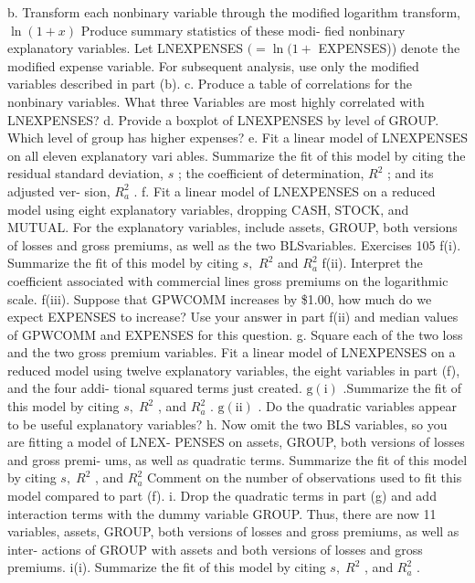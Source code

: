 \documentclass[11pt]{article}
\begin{document}
b. Transform each nonbinary variable through the modified logarithm
transform, \(\operatorname{l n} ( 1+x )\) Produce summary statistics of these modi-
fied nonbinary explanatory variables. Let LNEXPENSES \((=\operatorname{l n} ( 1+\)
EXPENSES)) denote the modified expense variable.
For subsequent analysis, use only the modified variables described
in part (b).
c. Produce a table of correlations for the nonbinary variables. What three
Variables are most highly correlated with LNEXPENSES?
d. Provide a boxplot of LNEXPENSES by level of GROUP. Which level
of group has higher expenses?
e. Fit a linear model of LNEXPENSES on all eleven explanatory vari
 ables. Summarize the fit of this model by citing the residual standard
 deviation, \(s\) ; the coefficient of determination, \(R^{2}\) ; and its adjusted ver-
 sion, \(R_{a}^{2}\) .
f. Fit a linear model of LNEXPENSES on a reduced model using eight
explanatory variables, dropping CASH, STOCK, and MUTUAL. For
the explanatory variables, include assets, GROUP, both versions of
losses and gross premiums, as well as the two BLSvariables.
 Exercises 105
f(i). Summarize the fit of this model by citing \(s , \, \, R^{2}\) and \(R_{a}^{2}\)
f(ii). Interpret the coefficient associated with commercial lines gross
 premiums on the logarithmic scale.
f(iii). Suppose that GPWCOMM increases by \$1.00, how much do we
expect EXPENSES to increase? Use your answer in part f(ii)
and median values of GPWCOMM and EXPENSES for this
question.
g. Square each of the two loss and the two gross premium variables. Fit
 a linear model of LNEXPENSES on a reduced model using twelve
explanatory variables, the eight variables in part (f), and the four addi-
 tional squared terms just created.
\(\mathrm{g ( i )}\) .Summarize the fit of this model by citing \(s , \; R^{2}\) , and \(R_{a}^{2}\) .
\(\mathrm{g ( i i )}\) . Do the quadratic variables appear to be useful explanatory
variables?
h. Now omit the two BLS variables, so you are fitting a model of LNEX-
PENSES on assets, GROUP, both versions of losses and gross premi-
ums, as well as quadratic terms. Summarize the fit of this model by
citing \(s , \; R^{2}\) , and \(R_{a}^{2}\) Comment on the number of observations used to
fit this model compared to part (f).
i. Drop the quadratic terms in part (g) and add interaction terms with
 the dummy variable GROUP. Thus, there are now 11 variables, assets,
GROUP, both versions of losses and gross premiums, as well as inter-
actions of GROUP with assets and both versions of losses and gross
premiums.
i(i). Summarize the fit of this model by citing \(s , \; R^{2}\) , and \(R_{a}^{2}\) .
\end{document}
